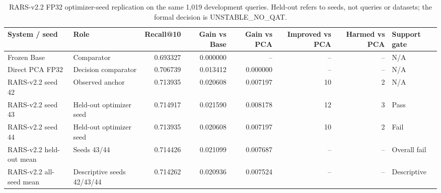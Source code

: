 \begin{table}[t]
\caption{RARS-v2.2 FP32 optimizer-seed replication on the same 1,019 development queries. Held-out refers to seeds, not queries or datasets; the formal decision is UNSTABLE_NO_QAT.}
\label{tab:rars-v2-2-fp32}
\begin{tabular}{llrrrrrl}
\toprule
System / seed & Role & Recall@10 & Gain vs Base & Gain vs PCA & Improved vs PCA & Harmed vs PCA & Support gate \\
\midrule
Frozen Base & Comparator & 0.693327 & 0.000000 & -- & -- & -- & N/A \\
Direct PCA FP32 & Decision comparator & 0.706739 & 0.013412 & 0.000000 & -- & -- & N/A \\
RARS-v2.2 seed 42 & Observed anchor & 0.713935 & 0.020608 & 0.007197 & 10 & 2 & N/A \\
RARS-v2.2 seed 43 & Held-out optimizer seed & 0.714917 & 0.021590 & 0.008178 & 12 & 3 & Pass \\
RARS-v2.2 seed 44 & Held-out optimizer seed & 0.713935 & 0.020608 & 0.007197 & 10 & 2 & Fail \\
RARS-v2.2 held-out mean & Seeds 43/44 & 0.714426 & 0.021099 & 0.007687 & -- & -- & Overall fail \\
RARS-v2.2 all-seed mean & Descriptive seeds 42/43/44 & 0.714262 & 0.020936 & 0.007524 & -- & -- & Descriptive \\
\bottomrule
\end{tabular}
\end{table}

